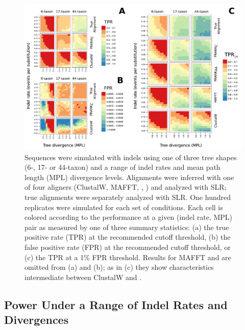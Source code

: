 \documentclass{article}
\begin{document}
\begin{figure}[t]
\begin{center}
\includegraphics[scale=0.8]{fig4.pdf}
\end{center}
\caption{Sequences were simulated with indels using one of three tree
  shapes (6-, 17- or 44-taxon) and a range of indel rates and mean
  path length (MPL) divergence levels. Alignments were inferred with
  one of four aligners (ClustalW, MAFFT, \pranka{}, \prankc) and
  analyzed with SLR; true alignments were separately analyzed with
  SLR. One hundred replicates were simulated for each set of
  conditions. Each cell is colored according to the performance at a
  given (indel rate, MPL) pair as measured by one of three summary
  statistics: (a) the true positive rate (TPR) at the recommended
  cutoff threshold, (b) the false positive rate (FPR) at the
  recommended cutoff threshold, or (c) the TPR at a 1\% FPR
  threshold. Results for MAFFT and \pranka are omitted from (a) and
  (b); as in (c) they show characteristics intermediate between
  ClustalW and \prankc.}
\label{fig_4}
\end{figure}

\subsection*{\Sw Power Under a Range of Indel Rates and Divergences}
\end{document}
